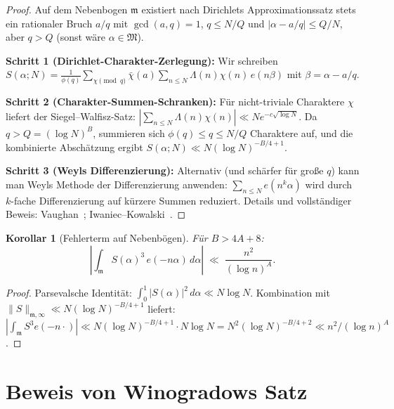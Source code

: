 \documentclass[12pt,a4paper]{amsart}
\newtheorem{korollar}[theorem]{Korollar}
\theoremstyle{definition}
\newcommand{\eq}[1]{e\!\left(#1\right)}
\begin{document}
\begin{proof}
  Auf dem Nebenbogen $\mathfrak{m}$ existiert nach Dirichlets Approximationssatz
  stets ein rationaler Bruch $a/q$ mit $\gcd(a,q)=1$, $q \leq N/Q$ und
  $|\alpha - a/q| \leq Q/N$, aber $q > Q$ (sonst wäre $\alpha \in \mathfrak{M}$).

  \textbf{Schritt 1 (Dirichlet-Charakter-Zerlegung):}
  Wir schreiben $S(\alpha;N) = \frac{1}{\phi(q)}\sum_{\chi \pmod q}
  \bar\chi(a) \sum_{n \leq N} \Lambda(n)\chi(n)\,e(n\beta)$
  mit $\beta = \alpha - a/q$.

  \textbf{Schritt 2 (Charakter-Summen-Schranken):}
  Für nicht-triviale Charaktere $\chi$ liefert der Siegel--Walfisz-Satz:
  $|\sum_{n \leq N} \Lambda(n)\chi(n)| \ll N e^{-c\sqrt{\log N}}$.
  Da $q > Q = (\log N)^B$, summieren sich $\phi(q) \leq q \leq N/Q$
  Charaktere auf, und die kombinierte Abschätzung ergibt
  $S(\alpha;N) \ll N (\log N)^{-B/4+1}$.

  \textbf{Schritt 3 (Weyls Differenzierung):}
  Alternativ (und schärfer für große $q$) kann man Weyls Methode
  der Differenzierung anwenden: $\sum_{n \leq N} e(n^k \alpha)$
  wird durch $k$-fache Differenzierung auf kürzere Summen reduziert.
  Details und vollständiger Beweis: Vaughan~\cite[Kap.~3 und 5]{Vaughan1981};
  Iwaniec--Kowalski~\cite[Kap.~20]{IwaniecKowalski}.
\end{proof}

\begin{korollar}[Fehlerterm auf Nebenbögen]\label{cor:nebenbogen}
  Für $B > 4A + 8$:
  \[
    \left|\int_{\mathfrak{m}} S(\alpha)^3\, \eq{-n\alpha}\, d\alpha\right|
    \;\ll\; \frac{n^2}{(\log n)^A}.
  \]
\end{korollar}

\begin{proof}
  Parsevalsche Identität: $\int_0^1 |S(\alpha)|^2\, d\alpha \ll N \log N$.
  Kombination mit $\|S\|_{\mathfrak{m},\infty} \ll N(\log N)^{-B/4+1}$ liefert:
  $|\int_{\mathfrak{m}} S^3 \eq{-n\cdot}| \ll N(\log N)^{-B/4+1} \cdot N\log N
  = N^2 (\log N)^{-B/4+2} \ll n^2 / (\log n)^A$.
\end{proof}

\section{Beweis von Winogradows Satz}
\label{sec:beweis}
\end{document}
